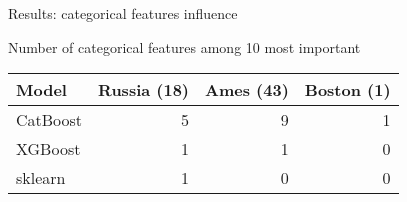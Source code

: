 \begin{frame}{Results: categorical features influence}
	
	Number of categorical features among 10 most important
	\begin{table}
		\centering
		\begin{tabular}{lrrr}
			\toprule
			\textbf{Model} & \textbf{Russia (18)} & \textbf{Ames (43)} & \textbf{Boston (1)} \\
			\midrule
			CatBoost & 5& 9 & 1 \\
			XGBoost & 1  & 1 & 0 \\
			sklearn & 1 & 0 & 0 \\
			\bottomrule
		\end{tabular}
	\end{table}
	
\end{frame}